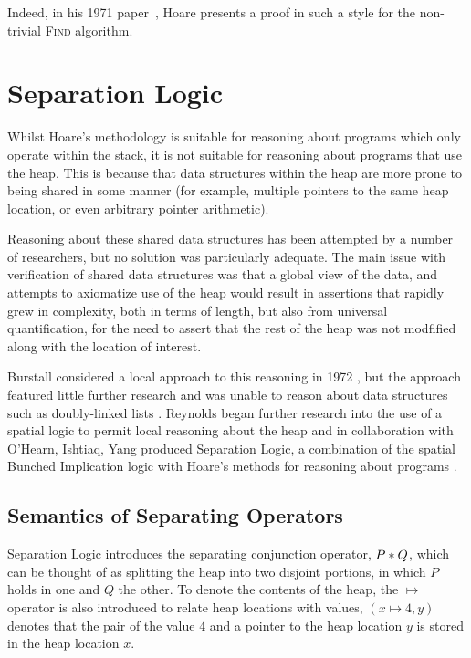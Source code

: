 \documentclass[a4paper]{report}
\begin{document}
  Indeed, in his 1971 paper~\cite{Hoare1971proof}, Hoare presents a proof in
  such a style for the non-trivial \textsc{Find} algorithm.


\section{Separation Logic}

  Whilst Hoare's methodology is suitable for reasoning about programs which only
  operate within the stack, it is not suitable for reasoning about programs that
  use the heap. This is because that data structures within the heap are more
  prone to being shared in some manner (for example, multiple pointers to the
  same heap location, or even arbitrary pointer arithmetic).
 
  Reasoning about these shared data structures has been attempted by a number of
  researchers, but no solution was particularly adequate. The main issue with
  verification of shared data structures was that a global view of the data, and
  attempts to axiomatize use of the heap would result in assertions
  that rapidly grew in complexity, both in terms of length, but also from
  universal quantification, for the need to assert that the rest of the heap was
  not modfified along with the location of interest.

  Burstall considered a local approach to this reasoning in 1972
  \cite{burstall1972some}, but the approach featured little further research and
  was unable to reason about data structures such as doubly-linked lists
  \cite{reynolds2000intuitionistic}. Reynolds began further research into the
  use of a spatial logic to permit local reasoning about the heap and in
  collaboration with O'Hearn, Ishtiaq, Yang produced Separation Logic, a
  combination of the spatial Bunched Implication logic with Hoare's methods for
  reasoning about programs
  \cite{Ishtiaq2001BI,OHearn2001Local,reynolds2000intuitionistic,Reynolds2002Separation}.

  \subsection{Semantics of Separating Operators}
  
  Separation Logic introduces the separating conjunction operator, $P \mathbin{*} Q$,
  which can be thought of as splitting the heap into two disjoint portions, in
  which $P$ holds in one and $Q$ the other. To denote the contents of the
  heap, the $\mapsto$ operator is also introduced to relate heap locations with
  values, $(x \mapsto 4, y)$ denotes that the pair of the value $4$ and a pointer
  to the heap location $y$ is stored in the heap location $x$.
\end{document}
